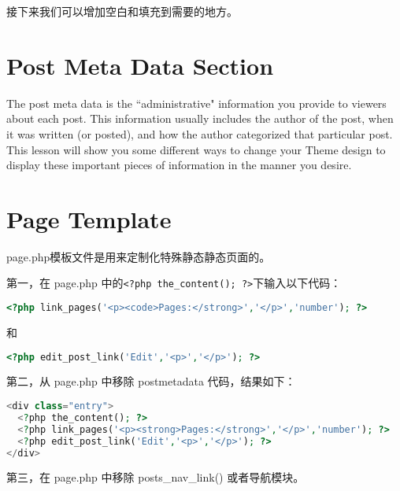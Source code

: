 接下来我们可以增加空白和填充到需要的地方。











\section{Post Meta Data Section}

The post meta data is the ``administrative" information you provide to viewers about each post. This information usually includes the author of the post, when it was written (or posted), and how the author categorized that particular post. This lesson will show you some different ways to change your Theme design to display these important pieces of information in the manner you desire.










\section{Page Template}



page.php\cite{wp_page}模板文件是用来定制化特殊静态静态页面的。

第一，在 page.php 中的\texttt{<?php the\_content(); ?>}下输入以下代码：

\begin{lstlisting}[language=PHP]
<?php link_pages('<p><code>Pages:</strong>','</p>','number'); ?>
\end{lstlisting}

和

\begin{lstlisting}[language=PHP]
<?php edit_post_link('Edit','<p>','</p>'); ?>
\end{lstlisting}

第二，从 page.php 中移除 postmetadata 代码，结果如下：


\begin{lstlisting}[language=PHP]
<div class="entry">
  <?php the_content(); ?>
  <?php link_pages('<p><strong>Pages:</strong>','</p>','number'); ?>
  <?php edit_post_link('Edit','<p>','</p>'); ?>
</div>
\end{lstlisting}


第三，在 page.php 中移除 posts\_nav\_link() 或者导航模块。

